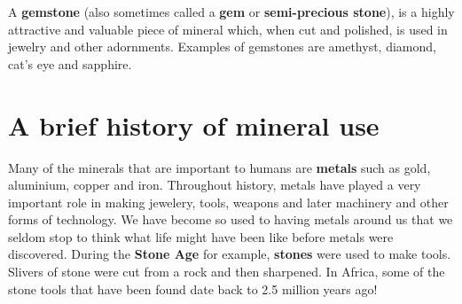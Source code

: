 
\begin{IFact}{
A \textbf{gemstone} (also sometimes called a \textbf{gem} or \textbf{semi-precious stone}), is a highly attractive and valuable piece of mineral which, when cut and polished, is used in jewelry and other adornments. Examples of gemstones are amethyst, diamond, cat's eye and sapphire.
}
\end{IFact}








\section{A brief history of mineral use}

Many of the minerals that are important to humans are \textbf{metals} such as gold, aluminium, copper and iron. Throughout history, metals have played a very important role in making jewelery, tools, weapons and later machinery and other forms of technology. We have become so used to having metals around us that we seldom stop to think what life might have been like before metals were discovered. During the \textbf{Stone Age} for example, \textbf{stones} were used to make tools. Slivers of stone were cut from a rock and then sharpened. In Africa, some of the stone tools that have been found date back to 2.5 million years ago! \\

